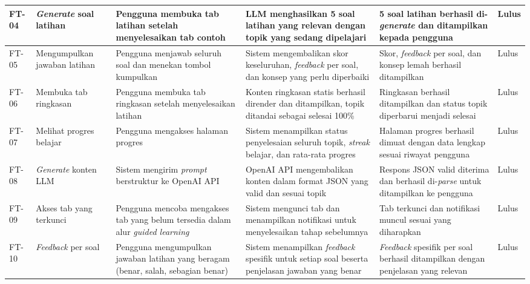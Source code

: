 \begin{longtable}{|L{0.8cm}|L{1.8cm}|L{2.2cm}|L{2.5cm}|L{2.5cm}|L{1.2cm}|}
FT-04 & \textit{Generate} soal latihan &
Pengguna membuka tab latihan setelah menyelesaikan tab contoh &
LLM menghasilkan 5 soal latihan yang relevan dengan topik yang sedang dipelajari &
5 soal latihan berhasil di-\textit{generate} dan ditampilkan kepada pengguna &
Lulus \\
\hline

FT-05 & Meng\-umpulkan jawaban latihan &
Pengguna menjawab seluruh soal dan menekan tombol kumpulkan &
Sistem mengembalikan skor keseluruhan, \textit{feedback} per soal, dan konsep yang perlu diperbaiki &
Skor, \textit{feedback} per soal, dan konsep lemah berhasil ditampilkan &
Lulus \\
\hline

FT-06 & Membuka tab ringkasan &
Pengguna membuka tab ringkasan setelah menyelesaikan latihan &
Konten ringkasan statis berhasil dirender dan ditampilkan, topik ditandai sebagai selesai 100\% &
Ringkasan berhasil ditampilkan dan status topik diperbarui menjadi selesai &
Lulus \\
\hline

FT-07 & Melihat progres belajar &
Pengguna mengakses halaman progres &
Sistem menampilkan status penyelesaian seluruh topik, \textit{streak} belajar, dan rata-rata progres &
Halaman progres berhasil dimuat dengan data lengkap sesuai riwayat pengguna &
Lulus \\
\hline

FT-08 & \textit{Generate} konten LLM &
Sistem mengirim \textit{prompt} berstruktur ke OpenAI API &
OpenAI API mengembalikan konten dalam format JSON yang valid dan sesuai topik &
Respons JSON valid diterima dan berhasil di-\textit{parse} untuk ditampilkan ke pengguna &
Lulus \\
\hline

FT-09 & Akses tab yang terkunci &
Pengguna mencoba mengakses tab yang belum tersedia dalam alur \textit{guided learning} &
Sistem mengunci tab dan menampilkan notifikasi untuk menyelesaikan tahap sebelumnya &
Tab terkunci dan notifikasi muncul sesuai yang diharapkan &
Lulus \\
\hline

FT-10 & \textit{Feedback} per soal &
Pengguna mengumpul\-kan jawaban latihan yang beragam (benar, salah, sebagian benar) &
Sistem menampilkan \textit{feedback} spesifik untuk setiap soal beserta penjelasan jawaban yang benar &
\textit{Feedback} spesifik per soal berhasil ditampilkan dengan penjelasan yang relevan &
Lulus \\
\hline


\end{longtable}
